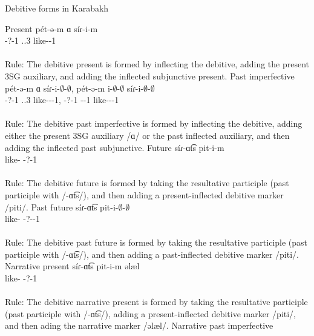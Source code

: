 \begin{exe}
	\ex Debitive forms in Karabakh \label{sent:Karabakh:morpho:verb:Debitive}
	\begin{xlist}
		\ex Present \gll 
		p\'et-ə-m ɑ s\'iɾ-i-m \\ 
		{\deb}-?-1{\sg} {\aux}.{\prs}.3{\sg} like-{\thgloss}-1{\sg} \\
		\trans {} \\Rule: The debitive present is formed by inflecting the debitive, adding the present 3SG auxiliary, and adding the inflected subjunctive present. 
		\ex Past imperfective \gll 
		p\'et-ə-m ɑ s\'iɾ-i-$\emptyset$-$\emptyset$, p\'et-ə-m i-$\emptyset$-$\emptyset$ s\'iɾ-i-$\emptyset$-$\emptyset$ \\ 
		{\deb}-?-1{\sg} {\aux}.{\prs}.3{\sg} like-{\thgloss}-{\pst}-1{\sg}, {\deb}-?-1{\sg} {\aux}-{\pst}-1{\sg} like-{\thgloss}-{\pst}-1{\sg} \\
		\trans {} \\
		Rule: The debitive past imperfective is formed by inflecting the debitive, adding either the present 3SG auxiliary /ɑ/ or the past inflected auxiliary, and then adding the inflected past subjunctive. 
		\ex Future \gll 
		s\'iɾ-ɑt͡s pit-i-m \\ 
		like-{\rptcp} {\deb}-?-1{\sg}\\ 
		\trans {} \\
		Rule: The debitive future is formed by taking the resultative participle (past participle with /-ɑt͡s/), and then adding a present-inflected debitive marker /piti/. 
		\ex Past future \gll 
		s\'iɾ-ɑt͡s pit-i-$\emptyset$-$\emptyset$ \\ 
		like-{\rptcp} {\deb}-?-{\pst}-1{\sg} \\ 
		\trans {}\\
		Rule: The debitive past future is formed by taking the resultative participle (past participle with /-ɑt͡s/), and then adding a past-inflected debitive marker /piti/.
		\ex Narrative present \gll 
		s\'iɾ-ɑt͡s pit-i-m əlæl\\ 
		like-{\rptcp} {\deb}-?-1{\sg} {\narr}\\ 
		\trans {} \\
		Rule: The debitive narrative present is formed by taking the resultative participle (past participle with /-ɑt͡s/), adding a present-inflected debitive marker /piti/, and then ading the narrative marker /əlæl/. 
		\ex Narrative past imperfective \gll 

\end{xlist}
\end{exe}
